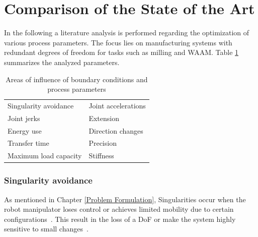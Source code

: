\section{Comparison of the State of the Art }%

In the following a literature analysis is performed regarding the optimization of various process parameters. The focus lies on manufacturing systems with redundant degrees of freedom for tasks such as milling and WAAM.
Table \ref{parameter} summarizes the analyzed parameters. 


\begin{table} [h!]
	\centering
	\begin{tabular}{|l|l|}
		\hline
		\hline
		Singularity avoidance \cite{Huo.2008b} & Joint accelerations \cite{Gasparetto.2010}\\
		Joint jerks \cite{Gasparetto.2010} & Extension \\
		Energy use \cite{Paryanto.2015} & Direction changes \cite{Halbauer.2013}\\
		Transfer time \cite{Hirzinger.2005} & Precision \cite{Pham.2018}\\
		Maximum load capacity \cite{Breaz.2017} & Stiffness \cite{Cvitanic.2020}\\
		\hline
		\hline
		
	\end{tabular}
	
	
	\caption{Areas of influence of boundary conditions and process parameters}
	\label{parameter}
\end{table}

\subsubsection{Singularity avoidance}
As mentioned in Chapter \ref{Problem Formulation}, Singularities occur when the robot manipulator loses control or achieves limited mobility due to certain configurations~\cite{Malyshev.2022}. This result in the loss of a DoF or make the system highly sensitive to small changes~\cite{Zhao.2021, Milenkovic.2021}.

